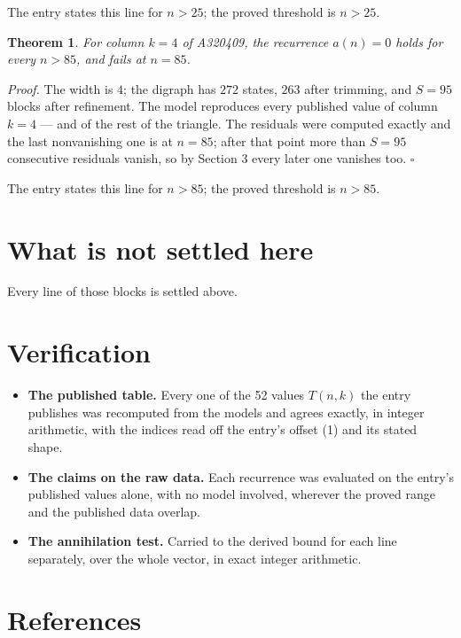 \documentclass[11pt]{article}
\newtheorem{theorem}{Theorem}
\theoremstyle{definition}
\begin{document}
The entry states this line for $n > 25$; the proved threshold is $n > 25$.

\begin{theorem} For column $k = 4$ of A320409, the recurrence $a(n) = 0$ holds for every $n > 85$, and fails at $n = 85$.\end{theorem}

{\itshape Proof.} The width is $4$; the digraph has $272$ states, $263$ after trimming, and $S = 95$ blocks after refinement. The model reproduces every published value of column $k = 4$ --- and of the rest of the triangle. The residuals were computed exactly and the last nonvanishing one is at $n = 85$; after that point more than $S = 95$ consecutive residuals vanish, so by Section 3 every later one vanishes too. $\square$

The entry states this line for $n > 85$; the proved threshold is $n > 85$.

\section{What is not settled here}

Every line of those blocks is settled above.

\section{Verification}

\begin{itemize}

\item {\bfseries The published table.} Every one of the 52 values $T(n,k)$ the entry publishes was recomputed from the models and agrees exactly, in integer arithmetic, with the indices read off the entry's offset (1) and its stated shape.

\item {\bfseries The claims on the raw data.} Each recurrence was evaluated on the entry's published values alone, with no model involved, wherever the proved range and the published data overlap.

\item {\bfseries The annihilation test.} Carried to the derived bound for each line separately, over the whole vector, in exact integer arithmetic.

\end{itemize}

\section{References}
\end{document}

